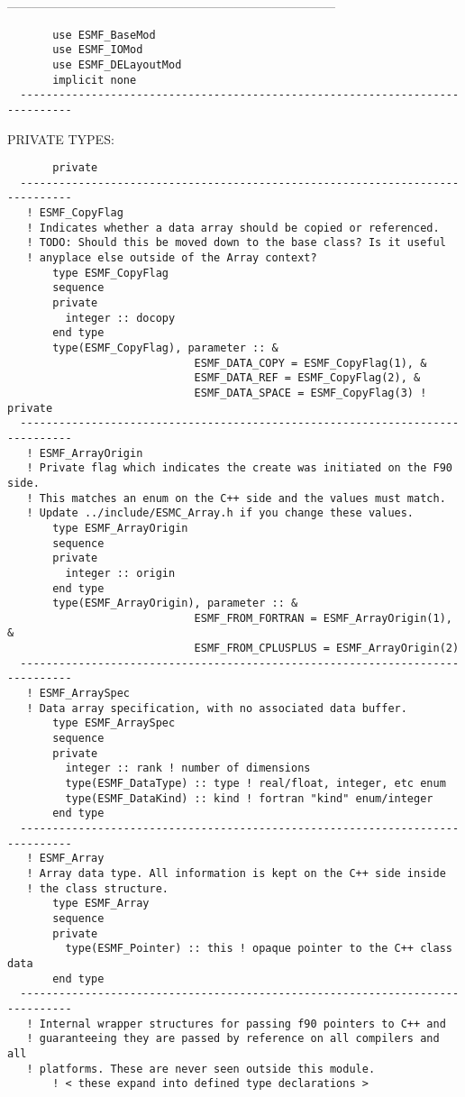   ------------------------------------------------------------------------------
\begin{verbatim}       use ESMF_BaseMod
       use ESMF_IOMod
       use ESMF_DELayoutMod
       implicit none
  ------------------------------------------------------------------------------\end{verbatim}{\sf PRIVATE TYPES:}
\begin{verbatim}       private
  ------------------------------------------------------------------------------
   ! ESMF_CopyFlag
   ! Indicates whether a data array should be copied or referenced.
   ! TODO: Should this be moved down to the base class? Is it useful
   ! anyplace else outside of the Array context?
       type ESMF_CopyFlag
       sequence
       private
         integer :: docopy
       end type
       type(ESMF_CopyFlag), parameter :: &
                             ESMF_DATA_COPY = ESMF_CopyFlag(1), &
                             ESMF_DATA_REF = ESMF_CopyFlag(2), &
                             ESMF_DATA_SPACE = ESMF_CopyFlag(3) ! private
  ------------------------------------------------------------------------------
   ! ESMF_ArrayOrigin
   ! Private flag which indicates the create was initiated on the F90 side.
   ! This matches an enum on the C++ side and the values must match.
   ! Update ../include/ESMC_Array.h if you change these values.
       type ESMF_ArrayOrigin
       sequence
       private
         integer :: origin
       end type
       type(ESMF_ArrayOrigin), parameter :: &
                             ESMF_FROM_FORTRAN = ESMF_ArrayOrigin(1), &
                             ESMF_FROM_CPLUSPLUS = ESMF_ArrayOrigin(2)
  ------------------------------------------------------------------------------
   ! ESMF_ArraySpec
   ! Data array specification, with no associated data buffer.
       type ESMF_ArraySpec
       sequence
       private
         integer :: rank ! number of dimensions
         type(ESMF_DataType) :: type ! real/float, integer, etc enum
         type(ESMF_DataKind) :: kind ! fortran "kind" enum/integer
       end type
  ------------------------------------------------------------------------------
   ! ESMF_Array
   ! Array data type. All information is kept on the C++ side inside
   ! the class structure.
       type ESMF_Array
       sequence
       private
         type(ESMF_Pointer) :: this ! opaque pointer to the C++ class data
       end type
  ------------------------------------------------------------------------------
   ! Internal wrapper structures for passing f90 pointers to C++ and
   ! guaranteeing they are passed by reference on all compilers and all
   ! platforms. These are never seen outside this module.
       ! < these expand into defined type declarations >
 

\end{verbatim}
